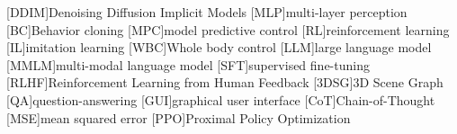 \usepackage{acronym}
\usepackage{xspace}
\usepackage{graphicx}
\usepackage{caption}
\usepackage{amsmath}
\usepackage{array}
\usepackage{xcolor}
\usepackage{subcaption}
\usepackage{booktabs}
\usepackage{comment}
\usepackage{tabularx}
\usepackage{multirow}
\usepackage{float}
\usepackage{dsfont}
\usepackage{siunitx}
\let\labelindent\relax
\usepackage{enumitem}
\usepackage{wrapfig}
\usepackage[pagebackref,breaklinks,colorlinks=true,linkcolor=cvprblue,citecolor=cvprblue,bookmarks=true]{hyperref}
\usepackage[capitalise,nameinlink]{cleveref}
\usepackage[sort]{cite}
\usepackage{multicol}

\makeatletter
\renewcommand{\paragraph}{%
  \@startsection{paragraph}{4}%
  {\z@}{0ex \@plus 0ex \@minus 0ex}{-1em}%
  {\hskip\parindent\normalfont\normalsize\bfseries}%
}
\makeatother

\newcommand{\etc}{\emph{etc.}\xspace}
\newcommand{\eg}{\emph{e.g.}\xspace}
\newcommand{\ie}{\emph{i.e.}\xspace}
\newcommand{\cf}{\emph{c.f.}\xspace}
\newcommand{\etal}{\emph{et al.}\xspace}
\newcommand{\sota}{\text{state-of-the-art}\xspace}

[DDIM]{Denoising Diffusion Implicit Models}
[MLP]{multi-layer perception}
[BC]{Behavior cloning}
[MPC]{model predictive control}
[RL]{reinforcement learning}
[IL]{imitation learning}
[WBC]{Whole body control}
[LLM]{large language model}
[MMLM]{multi-modal language model}
[SFT]{supervised fine-tuning}
[RLHF]{Reinforcement Learning from Human Feedback}
[3DSG]{3D Scene Graph}
[QA]{question-answering}
[GUI]{graphical user interface}
[CoT]{Chain-of-Thought}
[MSE]{mean squared error}
[PPO]{Proximal Policy Optimization}


\newcommand{\modelname}{\textsc{SynergAI}\xspace}
\newcommand{\supp}{\textit{appendix}\xspace}
\newcommand{\srh}{SR$_{\text{Human}}$}
\newcommand{\srl}{SR$_{\text{LLM}}$}
\newcommand{\sri}{SR$_{\text{Init}}$}
\newcommand{\tsri}{TSR$_{\text{Init}}$}
\newcommand{\rrr}{RR$_{\text{Interaction}}$}
\newcommand{\numtask}{7\xspace}


